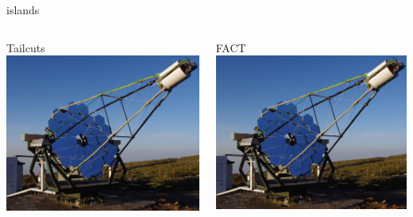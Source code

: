 \begin{frame}{islands}
    \begin{columns}[T] %
        \begin{column}{.48\textwidth}
            Tailcuts
            \includegraphics[width=\linewidth]{images/fact_telescope.jpg}
        \end{column}
        \begin{column}{.48\textwidth}
            FACT
            \includegraphics[width=\linewidth]{images/fact_telescope.jpg}
        \end{column}
    \end{columns}
\end{frame}